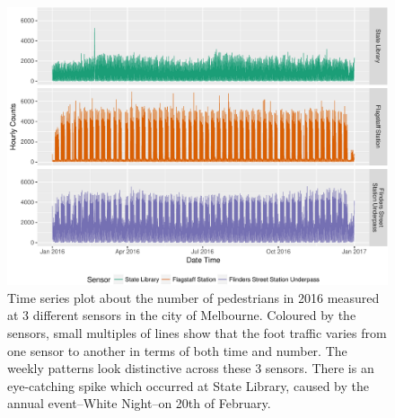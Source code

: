 \documentclass[article]{jss}
\theoremstyle{definition}
\theoremstyle{definition}
\theoremstyle{remark}
\begin{document}
\begin{CodeChunk}
\begin{figure}

{\centering \includegraphics[width=\textwidth]{figure/time-series-plot-1} 

}

\caption[Time series plot about the number of
pedestrians in 2016 measured at 3 different sensors in the city of
Melbourne. Coloured by the sensors, small multiples of lines show that
the foot traffic varies from one sensor to another in terms of both time
and number. The weekly patterns look distinctive across these 3 sensors.
There is an eye-catching spike which occurred at State Library, caused
by the annual event--White Night--on 20th of February.]{Time series plot about the number of
pedestrians in 2016 measured at 3 different sensors in the city of
Melbourne. Coloured by the sensors, small multiples of lines show that
the foot traffic varies from one sensor to another in terms of both time
and number. The weekly patterns look distinctive across these 3 sensors.
There is an eye-catching spike which occurred at State Library, caused
by the annual event--White Night--on 20th of February.}\label{fig:time-series-plot}
\end{figure}
\end{CodeChunk}
\end{document}
